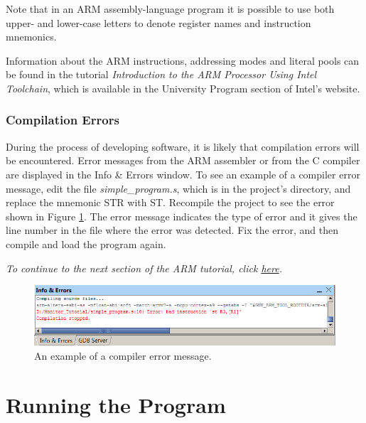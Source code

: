 \documentclass[11pt, twoside, pdftex]{article}
\begin{document}
Note that in an ARM assembly-language program it is possible to
use both upper- and lower-case letters to denote register names
and instruction mnemonics.

Information about the ARM instructions, addressing modes and
literal pools can be found in the tutorial
{\it Introduction to the ARM Processor Using Intel Toolchain},
which is available in the University Program section of Intel's
website. 

\subsubsection{Compilation Errors}

During the process of developing software, it is likely that compilation errors will be 
encountered. Error messages from the ARM assembler or from the C compiler are displayed in the \textsf{Info \& Errors} window. 
To see an example of a compiler error message, edit
the file {\it simple\_program.s}, which is in the project's directory, and replace the mnemonic STR with ST.
Recompile the project to see the error shown in Figure \ref{fig:AMP_compilererror_arm}. 
The error message indicates the type of error and it gives the
line number in the file where the error was detected. Fix the
error, and then compile and load the program again.

{\it To continue to the next section of the ARM tutorial, click \hyperref[tut:arm_2]{here}.}

\begin{figure}[H]
   \begin{center}
      \includegraphics[scale=1]{screenshots/figure19.png}
   \end{center}
   \caption{An example of a compiler error message.} 
   \label{fig:AMP_compilererror_arm}
\end{figure}

\section{Running the Program}
\end{document}
